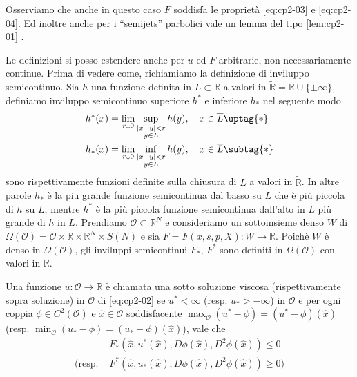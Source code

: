 \begin{osservazione}
Osserviamo che anche in questo caso $F$ soddisfa le proprietà \eqref{eq:cp2-03} e \eqref{eq:cp2-04}. Ed inoltre anche per i ``semijets'' parbolici vale un lemma del tipo \ref{lem:cp2-01} \cite[vedi][§3]{giga:main}.
\end{osservazione}

Le definizioni si posso estendere anche per $u$ ed $F$ arbitrarie, non necessariamente continue. Prima di vedere come, richiamiamo la definizione di inviluppo semicontinuo. Sia $h$ una funzione definita in $L\subset\mathbb{R}$ a valori in $\tilde{\mathbb{R}}=\mathbb{R}\cup\{\pm\infty\}$, definiamo inviluppo semicontinuo superiore $h^*$ e inferiore $h_*$ nel seguente modo
\begin{subequations}
\begin{align}
  \label{eq:cp2-03-1-add}%
  h^*(x) &= \lim_{r\downarrow 0}\sup_{\substack{|x-y|<r \\ y\in L}}h(y),\quad x\in\overline{L} \uptag{*} \\
  \label{eq:cp2-03-2-add}%
  h_*(x) &= \lim_{r\downarrow 0}\inf_{\substack{|x-y|<r \\ y\in L}}h(y),\quad x\in\overline{L} \subtag{*}
\end{align}
\end{subequations}
sono rispettivamente funzioni definite sulla chiusura di $L$ a valori in $\tilde{\mathbb{R}}$. In altre parole $h_*$ è la piu grande funzione semicontinua dal basso su $\overline{L}$ che è più piccola di $h$ su $L$, mentre $h^*$ è la più piccola funzione semicontinua dall'alto in $\overline{L}$ più grande di $h$ in $L$.
Prendiamo $\mathcal{O}\subset\mathbb{R}^N$ e consideriamo un sottoinsieme denso $W$ di $\Omega(\mathcal{O})=\mathcal{O}\times\mathbb{R}\times\mathbb{R}^N\times S(N)$ e sia $F=F(x,s,p,X):W\to\mathbb{R}$. Poichè $W$ è denso in $\Omega(\mathcal{O})$, gli inviluppi semicontinui $F_*$, $F^*$ sono definiti in $\Omega(\mathcal{O})$ con valori in $\tilde{\mathbb{R}}$.
\begin{definizione}
Una funzione $u:\mathcal{O}\to\mathbb{R}$ è chiamata una sotto soluzione viscosa (rispettivamente sopra soluzione) in $\mathcal{O}$ di \eqref{eq:cp2-02} se $u^*<\infty$ (resp. $u_*>-\infty$) in $\mathcal{O}$ e per ogni coppia $\phi\in C^2(\mathcal{O})$ e $\hat{x}\in\mathcal{O}$ soddisfacente $\max_{\mathcal{O}}(u^*-\phi)=(u^*-\phi)(\hat{x})$ (resp. $\min_{\mathcal{O}}(u_*-\phi)=(u_*-\phi)(\hat{x})$), vale che
\[
\begin{aligned}
&F_*(\hat{x},u^*(\hat{x}),D\phi(\hat{x}),D^2\phi(\hat{x}))\leq 0 \\
(\text{resp. }&F^*(\hat{x},u_*(\hat{x}),D\phi(\hat{x}),D^2\phi(\hat{x}))\geq 0)
\end{aligned}
\]
\end{definizione}
